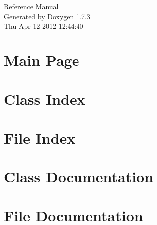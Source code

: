 \documentclass[a4paper]{book}
\begin{document}
\hypersetup{pageanchor=false}
\begin{titlepage}
\vspace*{7cm}
\begin{center}
{\Large Reference Manual}\\
\vspace*{1cm}
{\large Generated by Doxygen 1.7.3}\\
\vspace*{0.5cm}
{\small Thu Apr 12 2012 12:44:40}\\
\end{center}
\end{titlepage}
\clearemptydoublepage
{}
\tableofcontents
\clearemptydoublepage
{}
\hypersetup{pageanchor=true}
\chapter{Main Page}
\label{index}\hypertarget{index}{}
\chapter{Class Index}

\chapter{File Index}

\chapter{Class Documentation}


























\chapter{File Documentation}































\printindex
\end{document}
